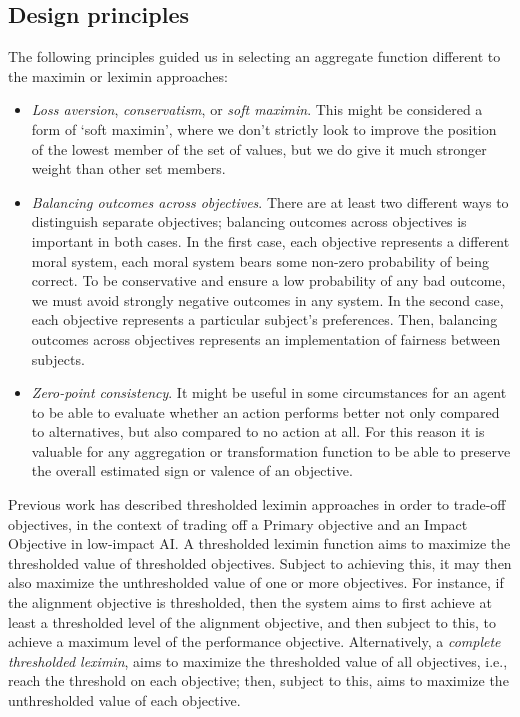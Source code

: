 \subsection{Design principles}
The following principles guided us in selecting an aggregate function different to the maximin or leximin approaches:
\begin{itemize}
    \item \textit{Loss aversion}, \textit{conservatism}, or \textit{soft maximin}. This might be considered a form of `soft maximin', where we don't strictly look to improve the position of the lowest member of the set of values, but we do give it much stronger weight than other set members.
    \item \textit{Balancing outcomes across objectives}. There are at least two different ways to distinguish separate objectives; balancing outcomes across objectives is important in both cases. In the first case, each objective represents a different moral system, each moral system bears some non-zero probability of being correct. To be conservative and ensure a low probability of any bad outcome, we must avoid strongly negative outcomes in any system. In the second case, each objective represents a particular subject's preferences. Then, balancing outcomes across objectives represents an implementation of fairness between subjects.
    \item \textit{Zero-point consistency}. It might be useful in some circumstances for an agent to be able to evaluate whether an action performs better not only compared to alternatives, but also compared to no action at all. For this reason it is valuable for any aggregation or transformation function to be able to preserve the overall estimated sign or valence of an objective.
\end{itemize}

Previous work \cite{vamplew_potential-based_2021} has described thresholded leximin approaches in order to trade-off objectives, in the context of trading off a Primary objective and an Impact Objective in low-impact AI. A thresholded leximin function aims to maximize the thresholded value of thresholded objectives. Subject to achieving this, it may then also maximize the unthresholded value of one or more objectives. For instance, if the alignment objective is thresholded, then the system aims to first achieve at least a thresholded level of the alignment objective, and then subject to this, to achieve a maximum level of the performance objective. Alternatively, a \textit{complete thresholded leximin}, aims to maximize the thresholded value of all objectives, i.e., reach the threshold on each objective; then, subject to this, aims to maximize the unthresholded value of each objective.

